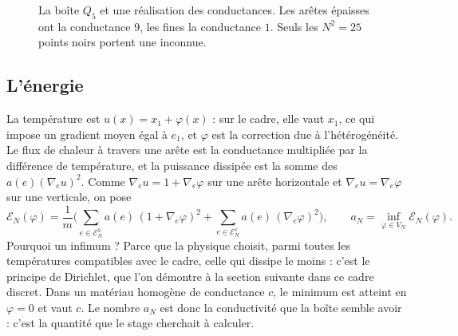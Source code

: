 \documentclass[11pt,a4paper]{article}
\theoremstyle{plain}
\theoremstyle{definition}
\theoremstyle{remark}
\newcommand{\E}{\mathcal{E}}
\begin{document}
\begin{figure}[h]
\centering
{}
\caption{La boîte $Q_5$ et une réalisation des conductances. Les arêtes épaisses ont la conductance $9$, les fines la conductance $1$. Seuls les $N^2=25$ points noirs portent une inconnue.}\label{fig:grille}
\end{figure}

\subsection{L'énergie}

La température est $u(x)=x_1+\varphi(x)$ : sur le cadre, elle vaut $x_1$, ce qui impose un gradient moyen égal à $e_1$, et $\varphi$ est la correction due à l'hétérogénéité. Le flux de chaleur à travers une arête est la conductance multipliée par la différence de température, et la puissance dissipée est la somme des $a(e)(\nabla_eu)^2$. Comme $\nabla_eu=1+\nabla_e\varphi$ sur une arête horizontale et $\nabla_eu=\nabla_e\varphi$ sur une verticale, on pose
\[
  \E_N(\varphi)=\frac1m\Big(\sum_{e\in\E^h_N}a(e)\,(1+\nabla_e\varphi)^2+\sum_{e\in\E^v_N}a(e)\,(\nabla_e\varphi)^2\Big),
  \qquad
  a_N=\inf_{\varphi\in V_N}\E_N(\varphi).
\]
Pourquoi un infimum ? Parce que la physique choisit, parmi toutes les températures compatibles avec le cadre, celle qui dissipe le moins : c'est le principe de Dirichlet, que l'on démontre à la section suivante dans ce cadre discret. Dans un matériau homogène de conductance $c$, le minimum est atteint en $\varphi=0$ et vaut $c$. Le nombre $a_N$ est donc la conductivité que la boîte semble avoir : c'est la quantité que le stage cherchait à calculer.
\end{document}
